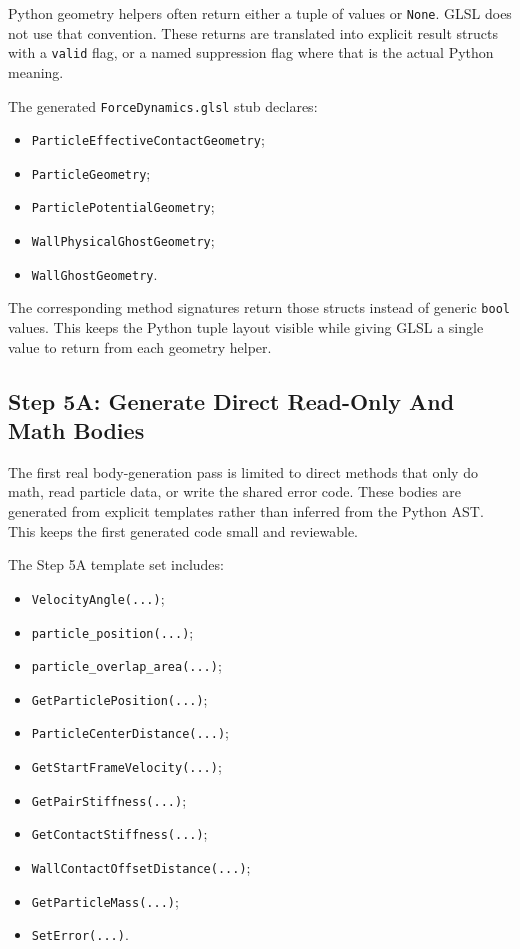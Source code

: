 Python geometry helpers often return either a tuple of values or
\texttt{None}.  GLSL does not use that convention.  These returns are
translated into explicit result structs with a \texttt{valid} flag, or a
named suppression flag where that is the actual Python meaning.

The generated \texttt{ForceDynamics.glsl} stub declares:
\begin{itemize}
    \item \texttt{ParticleEffectiveContactGeometry};
    \item \texttt{ParticleGeometry};
    \item \texttt{ParticlePotentialGeometry};
    \item \texttt{WallPhysicalGhostGeometry};
    \item \texttt{WallGhostGeometry}.
\end{itemize}

The corresponding method signatures return those structs instead of generic
\texttt{bool} values.  This keeps the Python tuple layout visible while giving
GLSL a single value to return from each geometry helper.

\subsection{Step 5A: Generate Direct Read-Only And Math Bodies}

The first real body-generation pass is limited to direct methods that only do
math, read particle data, or write the shared error code.  These bodies are
generated from explicit templates rather than inferred from the Python AST.
This keeps the first generated code small and reviewable.

The Step 5A template set includes:
\begin{itemize}
    \item \texttt{VelocityAngle(...)};
    \item \texttt{particle\_position(...)};
    \item \texttt{particle\_overlap\_area(...)};
    \item \texttt{GetParticlePosition(...)};
    \item \texttt{ParticleCenterDistance(...)};
    \item \texttt{GetStartFrameVelocity(...)};
    \item \texttt{GetPairStiffness(...)};
    \item \texttt{GetContactStiffness(...)};
    \item \texttt{WallContactOffsetDistance(...)};
    \item \texttt{GetParticleMass(...)};
    \item \texttt{SetError(...)}.
\end{itemize}

